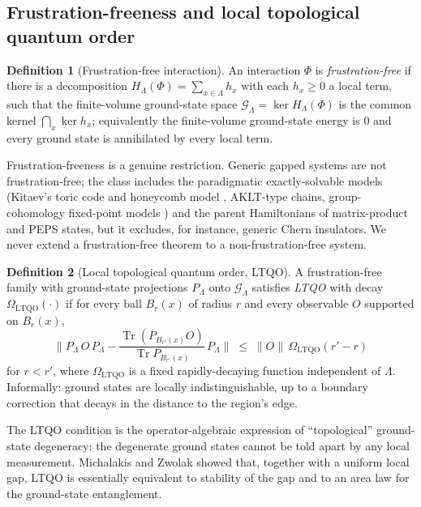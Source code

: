 \documentclass[12pt]{article}
\newcommand{\gsp}{\mathcal{G}}                 %
\newcommand{\norm}[1]{\lVert #1 \rVert}
\newcommand{\Tr}{\operatorname{Tr}}
\theoremstyle{plain}
\theoremstyle{definition}
\newtheorem{definition}[definition]{Definition}
\theoremstyle{remark}
\begin{document}
\subsection{Frustration-freeness and local topological quantum order}
\label{sec:stability-hypotheses}

\begin{definition}[Frustration-free interaction]
\label{def:ff}
An interaction $\Phi$ is \emph{frustration-free} if there is a decomposition
$H_\Lambda(\Phi)=\sum_{x\in\Lambda}h_x$ with each $h_x\ge 0$ a local term, such that
the finite-volume ground-state space $\gsp_\Lambda=\ker H_\Lambda(\Phi)$ is the common
kernel $\bigcap_x\ker h_x$; equivalently the finite-volume ground-state energy is $0$
and every ground state is annihilated by every local term.
\end{definition}

Frustration-freeness is a genuine restriction. Generic gapped systems are not
frustration-free; the class includes the paradigmatic exactly-solvable models
(Kitaev's toric code and honeycomb model \cite{kitaev-honeycomb}, AKLT-type chains,
group-cohomology fixed-point models \cite{cglw-cohomology}) and the parent
Hamiltonians of matrix-product and PEPS states, but it excludes, for instance,
generic Chern insulators. We never extend a frustration-free theorem to a
non-frustration-free system.

\begin{definition}[Local topological quantum order, LTQO]
\label{def:ltqo}
A frustration-free family with ground-state projections $P_\Lambda$ onto
$\gsp_\Lambda$ satisfies \emph{LTQO} with decay $\Omega_{\mathrm{LTQO}}(\cdot)$ if for
every ball $B_r(x)$ of radius $r$ and every observable $O$ supported on $B_r(x)$,
\[
\norm{P_\Lambda\,O\,P_\Lambda-\frac{\Tr(P_{B_{r'}(x)}O)}{\Tr P_{B_{r'}(x)}}\,P_\Lambda}
\;\le\;\norm{O}\,\Omega_{\mathrm{LTQO}}(r'-r)
\]
for $r<r'$, where $\Omega_{\mathrm{LTQO}}$ is a fixed rapidly-decaying function
independent of $\Lambda$. Informally: ground states are locally indistinguishable, up
to a boundary correction that decays in the distance to the region's edge.
\end{definition}

The LTQO condition is the operator-algebraic expression of ``topological'' ground-state
degeneracy: the degenerate ground states cannot be told apart by any local
measurement. Michalakis and Zwolak \cite{michalakis-zwolak} showed that, together with
a uniform local gap, LTQO is essentially equivalent to stability of the gap and to an
area law for the ground-state entanglement.
\end{document}
